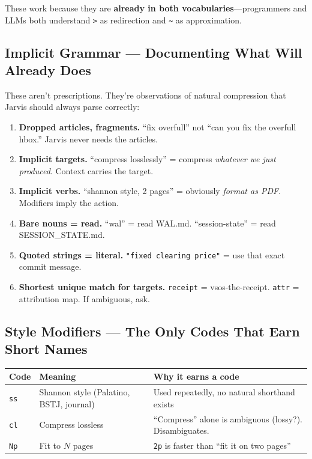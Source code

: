 \documentclass[9pt, letterpaper]{article}
\newcommand{\code}[1]{\texttt{#1}}
\begin{document}
\vspace{0.2em}
These work because they are \textbf{already in both vocabularies}---programmers and LLMs both understand \code{>} as redirection and \code{\textasciitilde} as approximation.

\subsection{Implicit Grammar --- Documenting What Will Already Does}

These aren't prescriptions. They're observations of natural compression that Jarvis should always parse correctly:

\begin{enumerate}
\item \textbf{Dropped articles, fragments.} ``fix overfull'' not ``can you fix the overfull hbox.'' Jarvis never needs the articles.
\item \textbf{Implicit targets.} ``compress losslessly'' = compress \textit{whatever we just produced}. Context carries the target.
\item \textbf{Implicit verbs.} ``shannon style, 2 pages'' = obviously \textit{format as PDF}. Modifiers imply the action.
\item \textbf{Bare nouns = read.} ``wal'' = read WAL.md. ``session-state'' = read SESSION\_STATE.md.
\item \textbf{Quoted strings = literal.} \code{"fixed clearing price"} = use that exact commit message.
\item \textbf{Shortest unique match for targets.} \code{receipt} = vsos-the-receipt. \code{attr} = attribution map. If ambiguous, ask.
\end{enumerate}

\subsection{Style Modifiers --- The Only Codes That Earn Short Names}

{\small
\begin{tabularx}{\textwidth}{@{} l l X @{}}
\toprule
\textbf{Code} & \textbf{Meaning} & \textbf{Why it earns a code} \\
\midrule
\code{ss} & Shannon style (Palatino, BSTJ, journal) & Used repeatedly, no natural shorthand exists \\
\code{cl} & Compress lossless & ``Compress'' alone is ambiguous (lossy?). Disambiguates. \\
\code{Np} & Fit to $N$ pages & \code{2p} is faster than ``fit it on two pages'' \\
\bottomrule
\end{tabularx}
}
\end{document}
